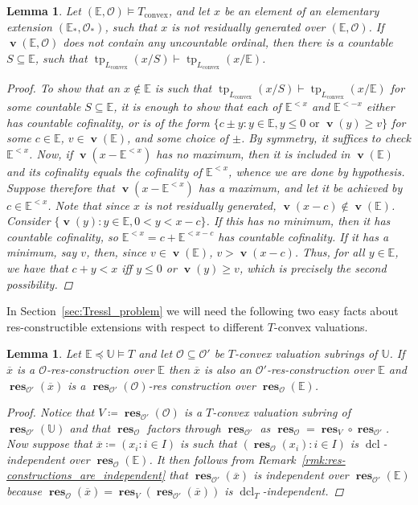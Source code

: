 \documentclass{amsart}
\newtheorem{lemma}[theorem]{Lemma}
\theoremstyle{remark}
\theoremstyle{definition}
\theoremstyle{plain}
\newcommand{\bE}{\mathbb E}
\newcommand{\bU}{\mathbb U}
\newcommand{\cO}{\mathcal O}
\newcommand{\convex}{\mathrm{convex}}
\DeclareMathOperator{\val}{\mathbf{v}}
\DeclareMathOperator{\res}{\mathbf{res}}
\DeclareMathOperator{\tp}{\mathrm{tp}}
\DeclareMathOperator{\dcl}{\mathrm{dcl}}
\theoremstyle{plain}
\begin{document}
\begin{lemma}\label{lem:countable_residual_cuts}
    Let $(\bE, \cO)\models T_\convex$, and let $x$ be an element of an elementary extension $(\bE_*,\cO_*)$, such that $x$ is not residually generated over $(\bE, \cO)$. If $\val(\bE, \cO)$ does not contain any uncountable ordinal, then there is a countable $S\subseteq \bE$, such that $\tp_{L_\convex}(x/S) \vdash \tp_{L_\convex}(x/\bE)$.
    \begin{proof}
        To show that an $x\notin \bE$ is such that $\tp_{L_\convex}(x/S) \vdash \tp_{L_\convex}(x/\bE)$ for some countable $S\subseteq \bE$, it is enough to show that each of $\bE^{<x}$ and $\bE^{<-x}$ either has countable cofinality, or is of the form $\{c\pm y : y \in \bE, y\leq 0 \text{ or }\val(y)\geq v\}$ for some $c \in \bE$, $v \in \val(\bE)$, and some choice of $\pm$. By symmetry, it suffices to check $\bE^{<x}$.
        Now, if $\val(x-\bE^{<x})$ has no maximum, then it is included in $\val(\bE)$ and its cofinality equals the cofinality of $\bE^{<x}$, whence we are done by hypothesis. Suppose therefore that $\val(x-\bE^{<x})$ has a maximum, and let it be achieved by $c \in \bE^{<x}$. Note that since $x$ is not residually generated, $\val(x-c) \notin \val(\bE)$.
        Consider $\{ \val(y) : y \in \bE, 0<y<x-c\}$. If this has no minimum, then it has countable cofinality, so $\bE^{<x} = c+\bE^{<x-c}$ has countable cofinality.
        If it has a minimum, say $v$, then, since $v \in \val(\bE)$, $v > \val(x-c)$.
        Thus, for all $y \in \bE$, we have that $c+y<x$ iff $y\leq 0$ or $\val(y)\geq v$, which is precisely the second possibility.
    \end{proof}
\end{lemma}

In Section~\ref{sec:Tressl_problem} we will need the following two easy facts about res-constructible extensions with respect to different $T$-convex valuations.

\begin{lemma}\label{lem:res-constr_for_different_vals}
    Let $\bE \preceq \bU \models T$ and let $\cO \subseteq \cO'$ be $T$-convex valuation subrings of $\bU$. If $\overline{x}$ is a $\cO$-res-construction over $\bE$ then $\overline{x}$ is also an $\cO'$-res-construction over $\bE$ and $\res_{\cO'}(\overline{x})$ is a $\res_{\cO'}(\cO)$-res construction over $\res_\cO(\bE)$.
    \begin{proof}
        Notice that $V\coloneqq \res_{\cO'}(\cO)$ is a $T$-convex valuation subring of $\res_{\cO'}(\bU)$ and that $\res_{\cO}$ factors through $\res_{\cO'}$ as $\res_{\cO} = \res_{V} \circ \res_{\cO'}$.
        Now suppose that $\overline{x}\coloneqq (x_i: i \in I)$ is such that $(\res_\cO(x_i): i \in I)$ is $\dcl$-independent over $\res_\cO(\bE)$. It then follows from Remark~\ref{rmk:res-constructions_are_independent} that $\res_{\cO'}(\overline{x})$ is independent over $\res_{\cO'}(\bE)$ because $\res_{\cO}(\overline{x})=\res_V (\res_{\cO'}(\overline{x}))$ is $\dcl_T$-independent.
    \end{proof}
\end{lemma}
\end{document}
